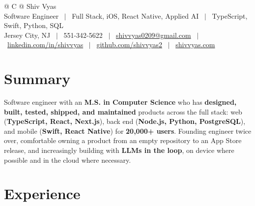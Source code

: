 \documentclass[a4paper,9.5pt]{article}
\begin{document}

\pagestyle{empty}

\begin{tabularx}{\linewidth}{@{} C @{}}
\LARGE{Shiv Vyas} \\[2pt]
\normalsize{Software Engineer \ $|$ \ Full Stack, iOS, React Native, Applied AI \ $|$ \ TypeScript, Swift, Python, SQL} \\[2pt]
Jersey City, NJ \ $|$ \
551-342-5622 \ $|$ \
\href{mailto:shivvyas0209@gmail.com}{shivvyas0209@gmail.com} \ $|$ \
\href{https://www.linkedin.com/in/shivvyas/}{linkedin.com/in/shivvyas} \ $|$ \
\href{https://github.com/shivvyas2}{github.com/shivvyas2} \ $|$ \
\href{https://shivvyas.com}{shivvyas.com} \\
\end{tabularx}

\vspace{2pt}

\section{Summary}
Software engineer with an \textbf{M.S. in Computer Science} who has \textbf{designed, built, tested, shipped, and maintained} products across the full stack: web (\textbf{TypeScript, React, Next.js}), back end (\textbf{Node.js, Python, PostgreSQL}), and mobile (\textbf{Swift, React Native}) for \textbf{20,000+ users}. Founding engineer twice over, comfortable owning a product from an empty repository to an App Store release, and increasingly building with \textbf{LLMs in the loop}, on device where possible and in the cloud where necessary.

\section{Experience}
\end{document}
